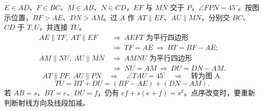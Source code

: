 \par\bigskip
\noindent\begin{minipage}{\linewidth}
\(E\in AD\)、\(F\in BC\)、\(M\in AB\)、\(N\in CD\)，\(EF\) 与 \(MN\) 交于 \(P\)，\(\angle FPN=45^\circ\)。按图示位置，\(BF>AE\)、\(DN>AM\)。过 \(A\) 作 \(AT\parallel EF\)、\(AU\parallel MN\)，分别交 \(BC\)、\(CD\) 于 \(T,U\)，并连接 \(TU\)。
\diagram{\figIntroD\hspace{1.2cm}\figIntroDSolve}
\[
\begin{aligned}
AE\parallel TF,\ AT\parallel EF
&\ \Longrightarrow\ AEFT\text{ 为平行四边形}\\
&\ \Longrightarrow\ TF=AE\ \Longrightarrow\ BT=BF-AE;\\[5pt]
AM\parallel NU,\ AU\parallel MN
&\ \Longrightarrow\ AMNU\text{ 为平行四边形}\\
&\ \Longrightarrow\ NU=AM\ \Longrightarrow\ DU=DN-AM.
\end{aligned}
\]
\[
AT\parallel PF,\ AU\parallel PN
\quad\Longrightarrow\quad\angle TAU=45^\circ
\quad\Longrightarrow\quad\text{转为图 A}.
\]
\[
\boxed{TU=BT+DU=(BF-AE)+(DN-AM)}.
\]
若 \(AB=s\)、\(BT=e\)、\(DU=f\)，仍有 \(ef+s(e+f)=s^2\)。点序改变时，要重新判断射线方向及线段加减。
\end{minipage}
\clearpage

